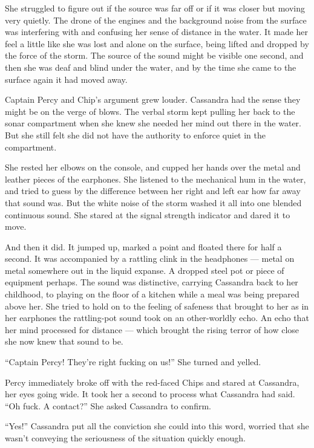 \documentclass[
]{scrbook}
\begin{document}
She struggled to figure out if the source was far off or if it was
closer but moving very quietly. The drone of the engines and the
background noise from the surface was interfering with and confusing her
sense of distance in the water. It made her feel a little like she was
lost and alone on the surface, being lifted and dropped by the force of
the storm. The source of the sound might be visible one second, and then
she was deaf and blind under the water, and by the time she came to the
surface again it had moved away.

Captain Percy and Chip's argument grew louder. Cassandra had the sense
they might be on the verge of blows. The verbal storm kept pulling her
back to the sonar compartment when she knew she needed her mind out
there in the water. But she still felt she did not have the authority to
enforce quiet in the compartment.

She rested her elbows on the console, and cupped her hands over the
metal and leather pieces of the earphones. She listened to the
mechanical hum in the water, and tried to guess by the difference
between her right and left ear how far away that sound was. But the
white noise of the storm washed it all into one blended continuous
sound. She stared at the signal strength indicator and dared it to move.

And then it did. It jumped up, marked a point and floated there for half
a second. It was accompanied by a rattling clink in the headphones ---
metal on metal somewhere out in the liquid expanse. A dropped steel pot
or piece of equipment perhaps. The sound was distinctive, carrying
Cassandra back to her childhood, to playing on the floor of a kitchen
while a meal was being prepared above her. She tried to hold on to the
feeling of safeness that brought to her as in her earphones the
rattling-pot sound took on an other-worldly echo. An echo that her mind
processed for distance --- which brought the rising terror of how close
she now knew that sound to be.

``Captain Percy! They're right fucking on us!'' She turned and yelled.

Percy immediately broke off with the red-faced Chips and stared at
Cassandra, her eyes going wide. It took her a second to process what
Cassandra had said. ``Oh fuck. A contact?'' She asked Cassandra to
confirm.

``Yes!'' Cassandra put all the conviction she could into this word,
worried that she wasn't conveying the seriousness of the situation
quickly enough.
\end{document}
